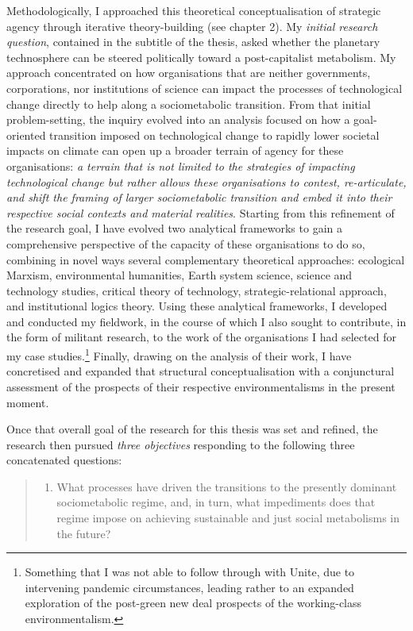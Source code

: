 \documentclass[a4paper, nobind]{templates/ociamthesis}
\providecommand{\tightlist}{%
  \setlength{\itemsep}{0pt}\setlength{\parskip}{0pt}}
\begin{document}
Methodologically, I approached this theoretical conceptualisation of strategic agency through iterative theory-building (see chapter 2). My \emph{initial research question}, contained in the subtitle of the thesis, asked whether the planetary technosphere can be steered politically toward a post-capitalist metabolism. My approach concentrated on how organisations that are neither governments, corporations, nor institutions of science can impact the processes of technological change directly to help along a sociometabolic transition. From that initial problem-setting, the inquiry evolved into an analysis focused on how a goal-oriented transition imposed on technological change to rapidly lower societal impacts on climate can open up a broader terrain of agency for these organisations: \emph{a terrain that is not limited to the strategies of impacting technological change but rather allows these organisations to contest, re-articulate, and shift the framing of larger sociometabolic transition and embed it into their respective social contexts and material realities}. Starting from this refinement of the research goal, I have evolved two analytical frameworks to gain a comprehensive perspective of the capacity of these organisations to do so, combining in novel ways several complementary theoretical approaches: ecological Marxism, environmental humanities, Earth system science, science and technology studies, critical theory of technology, strategic-relational approach, and institutional logics theory. Using these analytical frameworks, I developed and conducted my fieldwork, in the course of which I also sought to contribute, in the form of militant research, to the work of the organisations I had selected for my case studies.\footnote{Something that I was not able to follow through with Unite, due to intervening pandemic circumstances, leading rather to an expanded exploration of the post-green new deal prospects of the working-class environmentalism.} Finally, drawing on the analysis of their work, I have concretised and expanded that structural conceptualisation with a conjunctural assessment of the prospects of their respective environmentalisms in the present moment.

Once that overall goal of the research for this thesis was set and refined, the research then pursued \emph{three objectives} responding to the following three concatenated questions:

\begin{quote}
\begin{enumerate}
\def\labelenumi{\arabic{enumi}.}
\tightlist
\item
  What processes have driven the transitions to the presently dominant sociometabolic regime, and, in turn, what impediments does that regime impose on achieving sustainable and just social metabolisms in the future?
\end{enumerate}
\end{quote}
\end{document}
